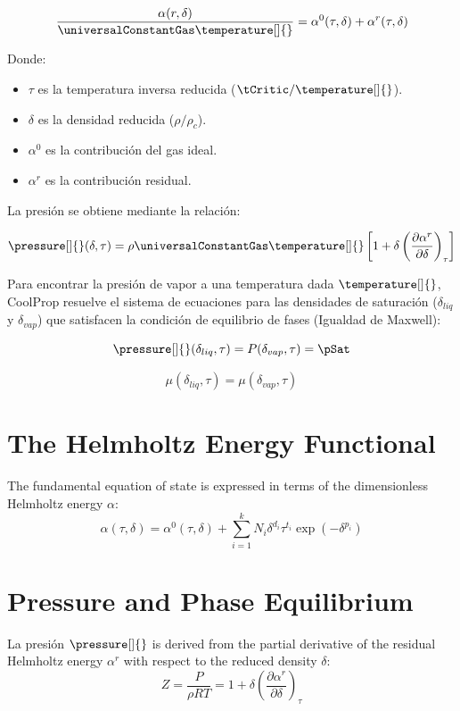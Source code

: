 \begin{equation}
\frac{\alpha(r, \delta)}{\universalConstantGas \temperature[]{}} = \alpha^0(\tau, \delta) + \alpha^r(\tau, \delta)
\end{equation}

Donde:
\begin{itemize}
    \item $\tau$ es la temperatura inversa reducida ($\tCritic / \temperature[]{}$).
    \item $\delta$ es la densidad reducida ($\rho / \rho_c$).
    \item $\alpha^0$ es la contribución del gas ideal.
    \item $\alpha^r$ es la contribución residual.
\end{itemize}

La presión se obtiene mediante la relación:

\begin{equation}
    \pressure[]{}(\delta, \tau) = \rho {\universalConstantGas \temperature[]{}} \left[ 1 + \delta \left( \frac{\partial \alpha^r}{\partial \delta} \right)_\tau \right]
\end{equation}

Para encontrar la presión de vapor a una temperatura dada $\temperature[]{}$, CoolProp resuelve el sistema de ecuaciones para las densidades de saturación ($\delta_{liq}$ y $\delta_{vap}$) que satisfacen la condición de equilibrio de fases (Igualdad de Maxwell):

\begin{equation}
    \pressure[]{}(\delta_{liq}, \tau) = P(\delta_{vap}, \tau) = \pSat
\end{equation}

\begin{equation}
    \mu(\delta_{liq}, \tau) = \mu(\delta_{vap}, \tau)
\end{equation}


\section{The Helmholtz Energy Functional}
The fundamental equation of state is expressed in terms of the dimensionless Helmholtz energy $\alpha$:
\begin{equation}
\alpha(\tau, \delta) = \alpha^0(\tau, \delta) + \sum_{i=1}^k N_i \delta^{d_i} \tau^{t_i} \exp(-\delta^{p_i})
\end{equation}

\section{Pressure and Phase Equilibrium}
La presión $\pressure[]{}$ is derived from the partial derivative of the residual Helmholtz energy $\alpha^r$ with respect to the reduced density $\delta$:
\begin{equation}
Z = \frac{P}{\rho RT} = 1 + \delta \left( \frac{\partial \alpha^r}{\partial \delta} \right)_\tau
\end{equation}

